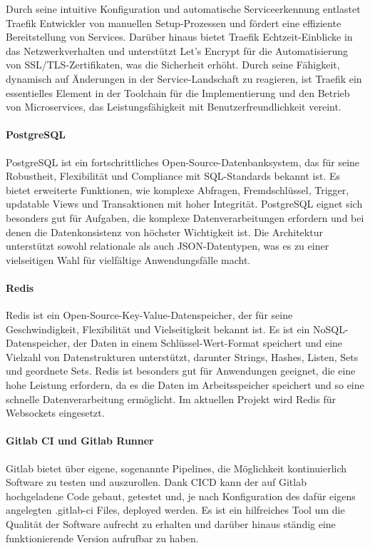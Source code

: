 Durch seine intuitive Konfiguration und automatische Serviceerkennung entlastet Traefik Entwickler von manuellen Setup-Prozessen und fördert eine effiziente 
Bereitstellung von Services. Darüber hinaus bietet Traefik Echtzeit-Einblicke in das Netzwerkverhalten und unterstützt Let's Encrypt für die Automatisierung 
von SSL/TLS-Zertifikaten, was die Sicherheit erhöht. Durch seine Fähigkeit, dynamisch auf Änderungen in der Service-Landschaft zu reagieren, ist Traefik ein 
essentielles Element in der Toolchain für die Implementierung und den Betrieb von Microservices, das Leistungsfähigkeit mit Benutzerfreundlichkeit vereint.


\paragraph{PostgreSQL}
PostgreSQL ist ein fortschrittliches Open-Source-Datenbanksystem, das für seine Robustheit, Flexibilität und Compliance mit SQL-Standards bekannt ist. 
Es bietet erweiterte Funktionen, wie komplexe Abfragen, Fremdschlüssel, Trigger, updatable Views und Transaktionen mit hoher Integrität. PostgreSQL eignet sich 
besonders gut für Aufgaben, die komplexe Datenverarbeitungen erfordern und bei denen die Datenkonsistenz von höchster Wichtigkeit ist. 
Die Architektur unterstützt sowohl relationale als auch JSON-Datentypen, was es zu einer vielseitigen Wahl für vielfältige Anwendungsfälle macht.

\paragraph{Redis}
\label{sec:redis}
Redis ist ein Open-Source-Key-Value-Datenspeicher, der für seine Geschwindigkeit, Flexibilität und Vielseitigkeit bekannt ist. 
Es ist ein NoSQL-Datenspeicher, der Daten in einem Schlüssel-Wert-Format speichert und eine Vielzahl von Datenstrukturen unterstützt, darunter Strings, Hashes, Listen, Sets und geordnete Sets.
Redis ist besonders gut für Anwendungen geeignet, die eine hohe Leistung erfordern, da es die Daten im Arbeitsspeicher speichert und so eine schnelle Datenverarbeitung ermöglicht. Im aktuellen Projekt wird Redis für Websockets eingesetzt.


\paragraph{Gitlab CI und Gitlab Runner}
Gitlab bietet über eigene, sogenannte Pipelines, die Möglichkeit kontinuierlich Software zu testen und auszurollen.
Dank \acf{CICD} kann der auf Gitlab hochgeladene Code gebaut, getestet und, je nach Konfiguration des dafür eigens angelegten .gitlab-ci Files, deployed werden.
Es ist ein hilfreiches Tool um die Qualität der Software aufrecht zu erhalten und darüber hinaus ständig eine funktionierende Version aufrufbar zu haben.

